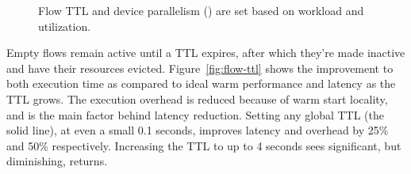 \begin{figure}
  \centering
  \hfill
  \hfill 
  \vspace{\captionspace}
  \caption{Flow TTL and device parallelism (\D) are set based on workload and utilization.}
  \vspace{\captionspace}
  \label{fig:knobs-all}
\end{figure}


Empty flows remain active until a TTL expires, after which they're made inactive and have their resources evicted.
Figure~\ref{fig:flow-ttl} shows the improvement to both execution time as compared to ideal warm performance and latency as the TTL grows.
The execution overhead is reduced because of warm start locality, and is the main factor behind latency reduction. 
Setting any global TTL (the solid line), at even a small 0.1 seconds, improves latency and overhead by 25\% and 50\% respectively. 
Increasing the TTL to up to 4 seconds sees significant, but diminishing, returns.


